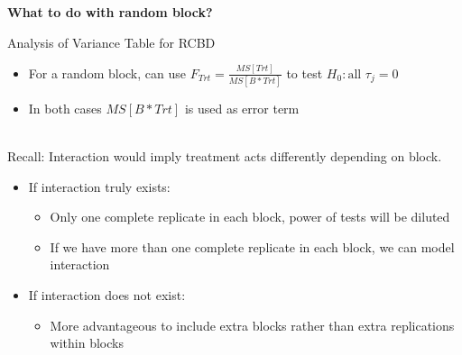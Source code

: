 \textbf{What to do with random block?}\\
    \begin{center}Analysis of Variance Table for RCBD\end{center}
    \begin{itemize}
   		\item{For a random block, can use $F_{Trt}=\frac{MS[Trt]}{MS[B*Trt]}$ to test $H_{0}: \text{all } \tau_{j}=0$}
   		\item{In both cases $MS[B*Trt]$ is used as error term}\\
		\end{itemize} 
~\\
Recall: Interaction would imply treatment acts differently depending on block.
\begin{itemize}
    \item{If interaction truly exists:}
    \begin{itemize}
        \item{Only one complete replicate in each block, power of tests will be diluted}
        \item{If we have more than one complete replicate in each block, we can model interaction}
     \end{itemize}
     \item{If interaction does not exist:}
			\begin{itemize}
			  \item{More advantageous to include extra blocks rather than extra replications within blocks}
    \end{itemize}
	\end{itemize}
	

